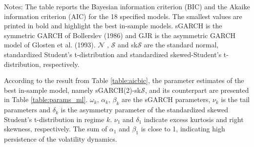 \documentclass[12pt,a4paper]{article}
\begin{document}
\begin{landscape}
\begin{table}[]
\begin{threeparttable}
\begin{tabular}{lccclccclccc}
\end{tabular}
\begin{tablenotes}
\small
\item Notes: The table reports the Bayesian information criterion (BIC) and the Akaike information criterion (AIC) for the 18 specified models. The smallest values are printed in bold and highlight the best in-sample models. sGARCH is the symmetric GARCH of Bollerslev (1986) and GJR is the asymmetric GARCH model of Glosten et al. (1993). $\mathcal{N}$ , $\mathcal{S}$ and sk$\mathcal{S}$ are the standard normal, standardized Student's t-distribution and standardized skewed-Student's t-distribution, respectively.
\end{tablenotes}
\end{threeparttable}
\end{table}
\end{landscape}

According to the result from Table \ref{table:aicbic}, the parameter estimates of the best in-sample model, namely sGARCH(2)-sk$\mathcal{S}$, and its counterpart are presented in Table \ref{table:params_ml}. $\omega_k$, $\alpha_k$, $\beta_k$ are the sGARCH parameters, $\nu_k$ is the tail parameters and $\delta_k$ is the asymmetry parameter of the standardized skewed Student's t-distribution in regime $k$. $\nu_1$ and $\delta_1$ indicate excess kurtosis and right skewness, respectively. The sum of $\alpha_1$ and $\beta_1$ is close to 1, indicating high persistence of the volatility dynamics.
\end{document}
